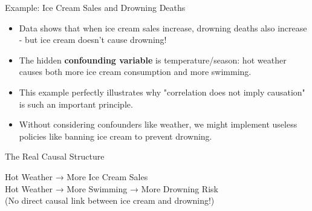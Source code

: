 \documentclass{beamer}
\begin{document}
	\begin{frame}{Example: Ice Cream Sales and Drowning Deaths}
		\begin{itemize}
			\item Data shows that when ice cream sales increase, drowning deaths also increase - but ice cream doesn't cause drowning!
			\item The hidden \textbf{confounding variable} is temperature/season: hot weather causes both more ice cream consumption and more swimming.
			\item This example perfectly illustrates why "correlation does not imply causation" is such an important principle.
			\item Without considering confounders like weather, we might implement useless policies like banning ice cream to prevent drowning.
		\end{itemize}
		
		\begin{block}{The Real Causal Structure}
			\begin{center}
				Hot Weather → More Ice Cream Sales\\
				Hot Weather → More Swimming → More Drowning Risk\\
				(No direct causal link between ice cream and drowning!)
			\end{center}
		\end{block}
	\end{frame}
	
\end{document}
